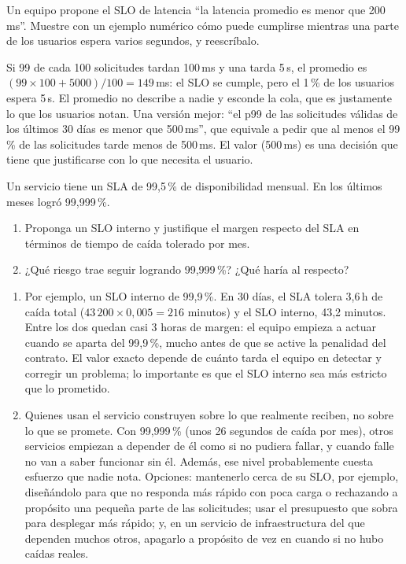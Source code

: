 \documentclass[variant=guia,cover=institutional,mode=screen]{ua-engineering-v6-article}
\begin{document}
\begin{uaexercise}
Un equipo propone el SLO de latencia ``la latencia promedio es menor que 200\,ms''. Muestre con un ejemplo numérico cómo puede cumplirse mientras una parte de los usuarios espera varios segundos, y reescríbalo.
\end{uaexercise}
\begin{uaanswer}
Si 99 de cada 100 solicitudes tardan 100\,ms y una tarda 5\,s, el promedio es $(99 \times 100 + 5000)/100 = 149$\,ms: el SLO se cumple, pero el 1\,\% de los usuarios espera 5\,s. El promedio no describe a nadie y esconde la cola, que es justamente lo que los usuarios notan. Una versión mejor: ``el p99 de las solicitudes válidas de los últimos 30 días es menor que 500\,ms'', que equivale a pedir que al menos el 99\,\% de las solicitudes tarde menos de 500\,ms. El valor (500\,ms) es una decisión que tiene que justificarse con lo que necesita el usuario.
\end{uaanswer}

\begin{uaexercise}
Un servicio tiene un SLA de 99,5\,\% de disponibilidad mensual. En los últimos meses logró 99,999\,\%.
\begin{enumerate}
\item Proponga un SLO interno y justifique el margen respecto del SLA en términos de tiempo de caída tolerado por mes.
\item ¿Qué riesgo trae seguir logrando 99,999\,\%? ¿Qué haría al respecto?
\end{enumerate}
\end{uaexercise}
\begin{uaanswer}
\begin{enumerate}
\item Por ejemplo, un SLO interno de 99,9\,\%. En 30 días, el SLA tolera 3,6\,h de caída total ($43\,200 \times 0{,}005 = 216$ minutos) y el SLO interno, 43,2 minutos. Entre los dos quedan casi 3 horas de margen: el equipo empieza a actuar cuando se aparta del 99,9\,\%, mucho antes de que se active la penalidad del contrato. El valor exacto depende de cuánto tarda el equipo en detectar y corregir un problema; lo importante es que el SLO interno sea más estricto que lo prometido.
\item Quienes usan el servicio construyen sobre lo que realmente reciben, no sobre lo que se promete. Con 99,999\,\% (unos 26 segundos de caída por mes), otros servicios empiezan a depender de él como si no pudiera fallar, y cuando falle no van a saber funcionar sin él. Además, ese nivel probablemente cuesta esfuerzo que nadie nota. Opciones: mantenerlo cerca de su SLO, por ejemplo, diseñándolo para que no responda más rápido con poca carga o rechazando a propósito una pequeña parte de las solicitudes; usar el presupuesto que sobra para desplegar más rápido; y, en un servicio de infraestructura del que dependen muchos otros, apagarlo a propósito de vez en cuando si no hubo caídas reales.
\end{enumerate}
\end{uaanswer}
\end{document}
